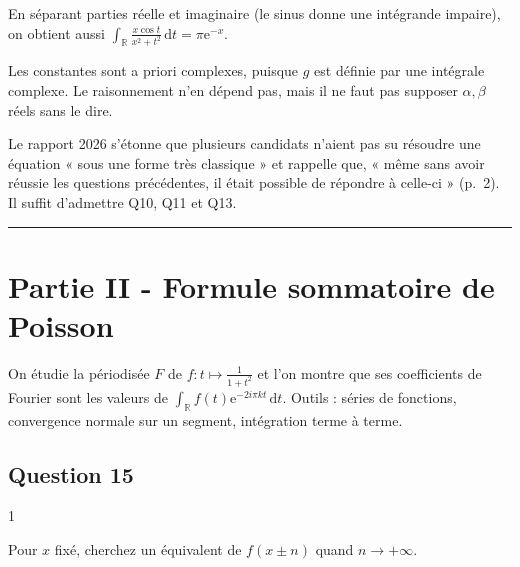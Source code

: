 \documentclass[11pt,a4paper]{article}
\newcommand{\equationajustee}[1]{%
  \sbox{\boiteequation}{$\displaystyle #1$}%
  \ifdim\wd\boiteequation>\linewidth
    \[\resizebox{\linewidth}{!}{\usebox{\boiteequation}}\]%
  \else
    \[#1\]%
  \fi}
\begin{document}
\equationajustee{\boxed{\forall x>0,\quad g(x)=\pi{\mathrm{e}}^{-x}.}}

En séparant parties réelle et imaginaire (le sinus donne une intégrande impaire), on obtient aussi \(\int_{\mathbb{R}}\frac{x\cos t}{x^2+t^2}\,\mathrm{d}t=\pi{\mathrm{e}}^{-x}\).

\begin{piege}

Les constantes sont a priori complexes, puisque \(g\) est définie par une intégrale complexe. Le raisonnement n'en dépend pas, mais il ne faut pas supposer \(\alpha,\beta\) réels sans le dire.

\end{piege}

\begin{jury}

Le rapport 2026 s'étonne que plusieurs candidats n'aient pas su résoudre une équation « sous une forme très classique » et rappelle que, « même sans avoir réussie les questions précédentes, il était possible de répondre à celle-ci » (p.~2). Il suffit d'admettre Q10, Q11 et Q13.

\end{jury}

\begin{center}\rule{0.5\linewidth}{0.5pt}\end{center}

\hypertarget{partie-ii---formule-sommatoire-de-poisson}{%
\section{Partie II - Formule sommatoire de Poisson}\label{partie-ii---formule-sommatoire-de-poisson}}

On étudie la périodisée \(F\) de \(f:t\mapsto\frac{1}{1+t^2}\) et l'on montre que ses coefficients de Fourier sont les valeurs de \(\int_{\mathbb{R}}f(t){\mathrm{e}}^{-2i\pi kt}\,\mathrm{d}t\). Outils : séries de fonctions, convergence normale sur un segment, intégration terme à terme.

\hypertarget{question-15}{%
\subsection{Question 15}\label{question-15}}

\begin{indication}{1}

Pour \(x\) fixé, cherchez un équivalent de \(f(x\pm n)\) quand \(n\to+\infty\).

\end{indication}
\end{document}
